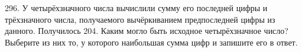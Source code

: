 296. У четырёхзначного числа вычислили сумму его последней цифры и трёхзначного числа, получаемого вычёркиванием предпоследней цифры из данного. Получилось 204. Каким могло быть исходное четырёхзначное число? Выберите из них то, у которого наибольшая сумма цифр и запишите его в ответ.\\
